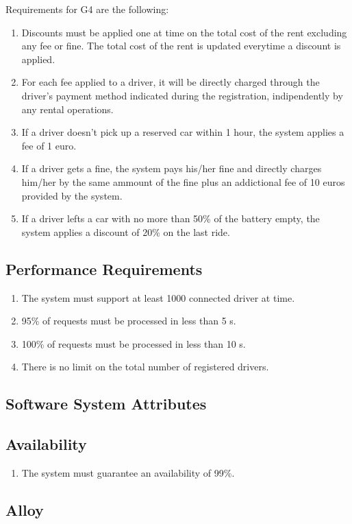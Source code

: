 
Requirements for G4 are the following:

\begin{enumerate}
	\item Discounts must be applied one at time on the total cost of the rent excluding any fee or fine. The total cost of the rent is updated everytime a discount is applied.
	\item For each fee applied to a driver, it will be directly charged through the driver's payment method indicated during the registration, indipendently by any rental operations.
	\item If a driver doesn't pick up a reserved car within 1 hour, the system applies a fee of 1 euro.
	\item If a driver gets a fine, the system pays his/her fine and directly charges him/her by the same ammount of the fine plus an addictional fee of 10 euros provided by the system.
	\item If a driver lefts a car with no more than 50\% of the battery empty, the system applies a discount of 20\% on the last ride.
\end{enumerate}

\subsection{Performance Requirements}

\begin{enumerate}
	\item The system must support at least 1000 connected driver at time.
	\item 95\% of requests must be processed in less than 5 s.
	\item 100\% of requests must be processed in less than 10 s.
	\item There is no limit on the total number of registered drivers.
\end{enumerate}

\subsection{Software System Attributes}

\subsection{Availability}

\begin{enumerate}
	\item The system must guarantee an availability of 99\%.
\end{enumerate}

\subsection{Alloy}